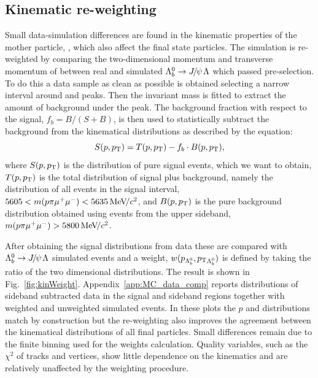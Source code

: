 \subsection{Kinematic re-weighting}
\label{sec:kinWeight}

Small data-simulation differences are found in the kinematic properties of the mother particle, \Lb,
which also affect the final state particles. The simulation is re-weighted by 
comparing the two-dimensional momentum and transverse momentum of \Lb between
real and simulated $\Lb\to\jpsi\Lz$ which passed pre-selection.
To do this a data sample as clean as possible is obtained selecting a narrow interval around \jpsi and \Lb peaks.
Then the \Lb invariant mass is fitted to extract the amount of background under the peak.
The background fraction with respect to the signal, $f_b = B/(S+B)$, is then used to statistically
subtract the background from the kinematical distributions as described by the equation:
%
\begin{equation}
S(p,\mbox{$p_{\rm T}$}) = T(p,\mbox{$p_{\rm T}$}) - f_b\cdot B(p,\mbox{$p_{\rm T}$}),
\end{equation}
\noindent
where $S(p,\mbox{$p_{\rm T}$})$ is the distribution of pure signal events, which we want to obtain, $T(p,\mbox{$p_{\rm T}$})$ is the total
distribution of signal plus background, namely the distribution of all events in the signal interval,
$5605 < m(p\pi\mumu) < 5635 \mevcc$, and $B(p,\mbox{$p_{\rm T}$})$ is the pure background
distribution obtained using events from the upper sideband, $m(p\pi\mumu) > 5800 \mevcc$.

After obtaining the signal distributions from data these are compared with $\Lb\to\jpsi\Lz$ simulated events
and a weight, $w(p_{{{\Lambda}^0_{b}}},\mbox{$p_{\rm T}$}_{{{\Lambda}^0_{b}}})$ is defined by taking the ratio of the two dimensional distributions.
The result is shown in Fig.~\ref{fig:kinWeight}. Appendix~\ref{app:MC_data_comp} reports distributions
of sideband subtracted data in the signal and sideband regions together with weighted and unweighted simulated events.
In these plots the \Lb $p$ and \pt distributions match by construction but the re-weighting also improves the agreement 
between the kinematical distributions of all final particles. Small differences remain due to
the finite binning used for the weights calculation. Quality variables, such as the $\chi^2$ of tracks
and vertices, show little dependence on the kinematics and are relatively unaffected by the weighting procedure.

